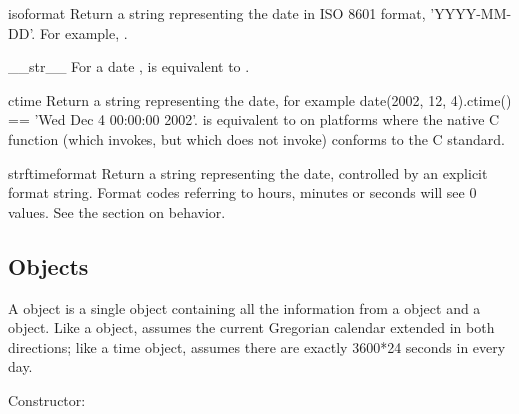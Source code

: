 \begin{methoddesc}{isoformat}{}
  Return a string representing the date in ISO 8601 format,
  'YYYY-MM-DD'.  For example,
  .
\end{methoddesc}

\begin{methoddesc}{__str__}{}
  For a date ,  is equivalent to
  .
\end{methoddesc}

\begin{methoddesc}{ctime}{}
  Return a string representing the date, for example
  date(2002, 12, 4).ctime() == 'Wed Dec  4 00:00:00 2002'.
   is equivalent to
  on platforms where the native C  function
  (which  invokes, but which
   does not invoke) conforms to the C standard.
\end{methoddesc}

\begin{methoddesc}{strftime}{format}
  Return a string representing the date, controlled by an explicit
  format string.  Format codes referring to hours, minutes or seconds
  will see 0 values.
  See the section on  behavior.
\end{methoddesc}


\subsection{ Objects \label{datetime-datetime}}

A  object is a single object containing all the
information from a  object and a  object.  Like a
 object,  assumes the current Gregorian
calendar extended in both directions; like a time object,
 assumes there are exactly 3600*24 seconds in every
day.

Constructor:


